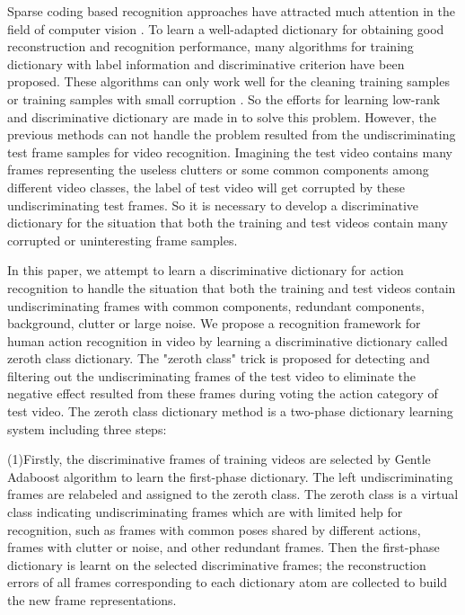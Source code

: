 \documentclass{article}
\begin{document}
Sparse coding based recognition approaches have attracted much attention in the field of computer vision \cite{Huang2014Feature}.
To learn a well-adapted dictionary for obtaining good reconstruction and recognition performance,
many algorithms \cite{Jiang2013,Yang2014,Shrivastava2014} for training dictionary with label information and discriminative criterion have been proposed.
These algorithms can only work well for the cleaning training samples or training samples with small corruption \cite{Li2014}.
So the efforts for learning low-rank and discriminative dictionary are made in \cite{Li2014,MaCVPR2012} to solve this problem.
However, the previous methods  can not handle the problem resulted from the undiscriminating test frame samples for video recognition.
Imagining the test video  contains many frames representing the useless clutters  or some common  components among different video classes,  the label of test video will get corrupted by these undiscriminating test frames.
So it is necessary to develop a discriminative dictionary for the situation that both the training and test videos contain many corrupted or uninteresting frame samples.



In this paper, we attempt to learn a discriminative dictionary for action recognition to handle the situation that both the training and test videos contain  undiscriminating  frames with common components, redundant components, background, clutter or large noise.
We  propose a recognition framework for human action recognition in video by learning a  discriminative dictionary called zeroth class dictionary.
 The "zeroth class" trick is proposed for detecting and filtering out the undiscriminating frames of the test video to eliminate the negative effect resulted from these frames during voting the action category of test video.
 The zeroth class dictionary method is a two-phase  dictionary learning system \cite{Bai2014Multiple,Li2011MULTI} including three steps:

 (1)Firstly, the discriminative frames of  training videos are selected  by Gentle Adaboost algorithm  to learn the first-phase  dictionary.
 The left undiscriminating frames are relabeled and assigned to the zeroth class.
The zeroth class is a virtual class indicating undiscriminating frames which are  with limited help for recognition,
such as frames with common poses shared by different actions, frames with clutter or noise, and other redundant frames.
Then the first-phase  dictionary is learnt on the  selected discriminative frames;
the reconstruction errors of all frames corresponding to each dictionary atom are collected to build the new frame representations.
\end{document}
